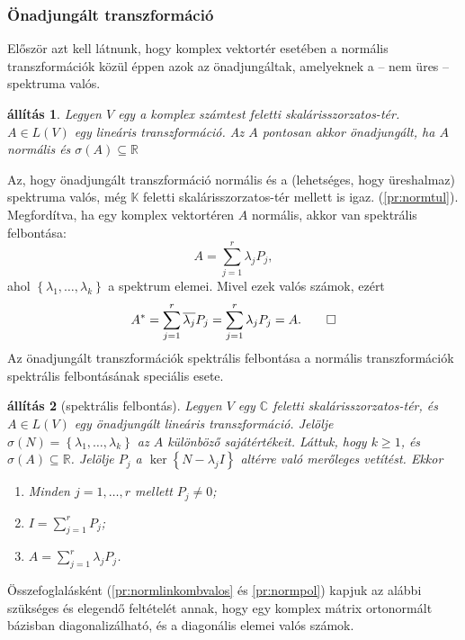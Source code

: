 \documentclass[9pt, a4paper, showtrims]{memoir}
\makeatletter
\renewenvironment{proof}[1][\proofname]
    {\par\pushQED{\qed}%
    \normalfont \topsep6\p@\@plus6\p@\relax
    \trivlist
    \item[\hskip\labelsep
        \itshape
    #1\@addpunct{:}]\ignorespaces}
    {\popQED\endtrivlist\@endpefalse}
\theoremstyle{plain}
\newtheorem{proposition}{állítás}[chapter]
\theoremstyle{remark}
\theoremstyle{definition}
\makeatother
\begin{document}
\subsubsection{Önadjungált transzformáció}
Először azt kell látnunk, 
hogy komplex vektortér esetében a normális transzformációk közül éppen azok az önadjungáltak,
amelyeknek a -- nem üres -- spektruma valós.
\begin{proposition}
    Legyen $V$ egy a komplex számtest feletti skalárisszorzatos-tér.
    $A\in L\left( V \right)$ egy lineáris transzformáció.
    Az $A$ pontosan akkor önadjungált, ha $A$ normális és $\sigma\left( A \right)\subseteq\mathbb{R}$
\end{proposition}
\begin{proof}
    Az, hogy önadjungált transzformáció normális és a (lehetséges, hogy üreshalmaz) spektruma valós,
    még $\mathbb{K}$ feletti skalárisszorzatos-tér mellett is igaz. (\ref{pr:normtul}).
    Megfordítva, 
    ha egy komplex vektortéren $A$ normális, akkor van spektrális felbontása:
    \[
        A=\sum_{j=1}^r\lambda_jP_j,
    \]
    ahol $\left\{ \lambda_1,\dots,\lambda_k \right\}$ a spektrum elemei.
    Mivel ezek valós számok, 
    ezért 
    \[
        A^\ast=\sum_{j=1}^r\overline{\lambda_j}P_j=
        \sum_{j=1}^r\lambda_jP_j=A.
        \qedhere
    \]
\end{proof}
Az önadjungált transzformációk spektrális felbontása 
a normális transzformációk spektrális felbontásának speciális esete.
\begin{proposition}[spektrális felbontás]
    Legyen $V$ egy $\mathbb{C}$ feletti skalárisszorzatos-tér, és $A\in L\left( V \right)$
    egy önadjungált lineáris transzformáció.
    Jelölje $\sigma\left( N \right)=\left\{\lambda_1,\dots,\lambda_k  \right\}$ az $A$ különböző sajátértékeit.
    Láttuk, hogy $k\geq 1$, és $\sigma\left( A \right)\subseteq \mathbb{R}$.
    Jelölje $P_j$ a $\ker\left\{ N-\lambda_jI \right\}$ altérre való merőleges vetítést.
    Ekkor
    \begin{enumerate}
        \item Minden $j=1,\dots,r$ mellett $P_j\neq 0$;
        \item $I=\sum_{j=1}^rP_j$;
        \item $A=\sum_{j=1}^r\lambda_jP_j$.
            \qedhere
    \end{enumerate}
\end{proposition}
Összefoglalásként (\ref{pr:normlinkombvalos} és \ref{pr:normpol}) kapjuk az alábbi szükséges és elegendő feltételét annak,
hogy egy komplex mátrix ortonormált bázisban diagonalizálható, és a diagonális elemei valós számok.
\end{document}
